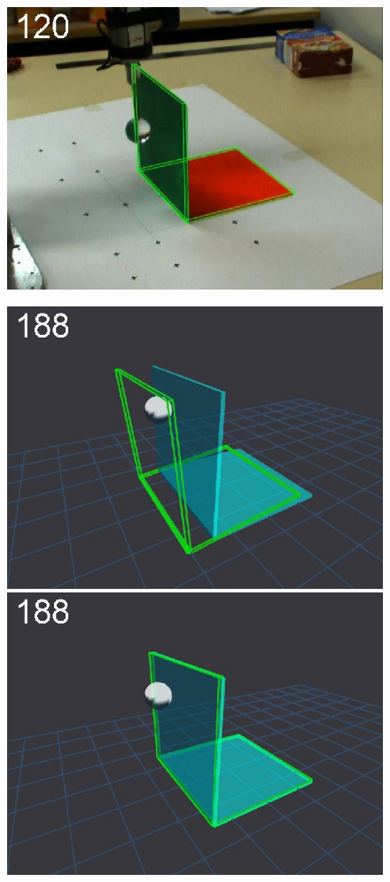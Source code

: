 \begin{figure}[tb]
{\includegraphics[width=\imgBXwid]{./B2_2exp_38_1}
}
\centerline{
\includegraphics[width=\imgBXwid]{./B1_1exp_20_2}
\includegraphics[width=\imgBXwid]{./B1_2exp_20_2}
}
\end{figure}
